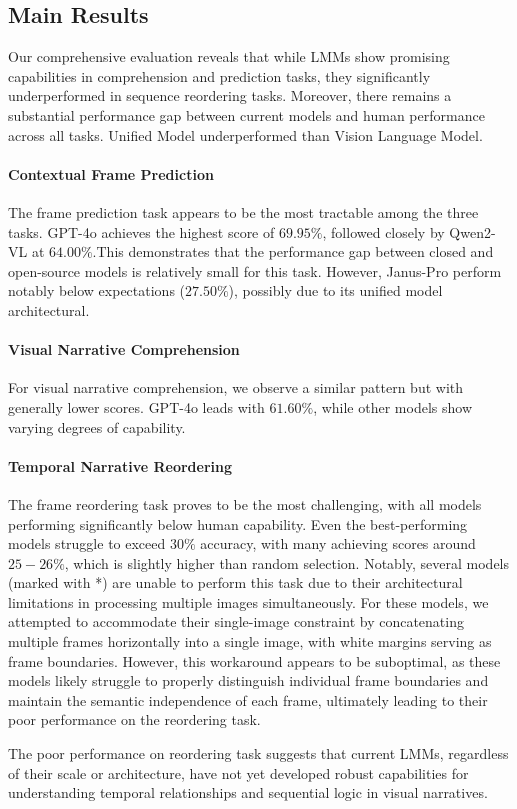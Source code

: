 \subsection{Main Results}
Our comprehensive evaluation reveals that while LMMs show promising capabilities in comprehension and prediction tasks, they significantly underperformed in sequence reordering tasks. Moreover, there remains a substantial performance gap between current models and human performance across all tasks. Unified Model underperformed than Vision Language Model.

\paragraph{Contextual Frame Prediction}
The frame prediction task appears to be the most tractable among the three tasks. GPT-4o achieves the highest score of $69.95\%$, followed closely by Qwen2-VL at $64.00\%$.This demonstrates that the performance gap between closed and open-source models is relatively small for this task. However, Janus-Pro perform notably below expectations ($27.50\%$), possibly due to its unified model architectural.

\paragraph{Visual Narrative Comprehension}
For visual narrative comprehension, we observe a similar pattern but with generally lower scores. GPT-4o leads with $61.60\%$, while other models show varying degrees of capability. 

\paragraph{Temporal Narrative Reordering}
The frame reordering task proves to be the most challenging, with all models performing significantly below human capability. Even the best-performing models struggle to exceed $30\%$ accuracy, with many achieving scores around $25-26\%$, which is slightly higher than random selection. 
Notably, several models (marked with *) are unable to perform this task due to their architectural limitations in processing multiple images simultaneously. For these models, we attempted to accommodate their single-image constraint by concatenating multiple frames horizontally into a single image, with white margins serving as frame boundaries. However, this workaround appears to be suboptimal, as these models likely struggle to properly distinguish individual frame boundaries and maintain the semantic independence of each frame, ultimately leading to their poor performance on the reordering task. 

The poor performance on reordering task suggests that current LMMs, regardless of their scale or architecture, have not yet developed robust capabilities for understanding temporal relationships and sequential logic in visual narratives.



